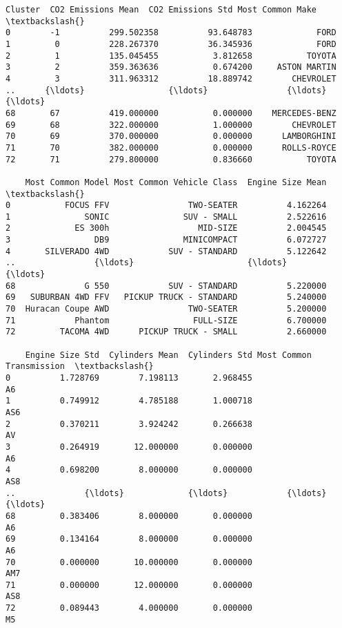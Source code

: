 \documentclass[11pt]{article}
\makeatletter
\newcommand{\boxspacing}{\kern\kvtcb@left@rule\kern\kvtcb@boxsep}
\newcommand{\prompt}[4]{
        {\ttfamily\llap{{\color{#2}[#3]:\hspace{3pt}#4}}\vspace{-\baselineskip}}
    }
\makeatother
\begin{document}
            \begin{tcolorbox}[breakable, size=fbox, boxrule=.5pt, pad at break*=1mm, opacityfill=0]
\prompt{Out}{outcolor}{68}{\boxspacing}
\begin{Verbatim}[commandchars=\\\{\}]
    Cluster  CO2 Emissions Mean  CO2 Emissions Std Most Common Make  \textbackslash{}
0        -1          299.502358          93.648783             FORD
1         0          228.267370          36.345936             FORD
2         1          135.045455           3.812658           TOYOTA
3         2          359.363636           0.674200     ASTON MARTIN
4         3          311.963312          18.889742        CHEVROLET
..      {\ldots}                 {\ldots}                {\ldots}              {\ldots}
68       67          419.000000           0.000000    MERCEDES-BENZ
69       68          322.000000           1.000000        CHEVROLET
70       69          370.000000           0.000000      LAMBORGHINI
71       70          382.000000           0.000000      ROLLS-ROYCE
72       71          279.800000           0.836660           TOYOTA

    Most Common Model Most Common Vehicle Class  Engine Size Mean  \textbackslash{}
0           FOCUS FFV                TWO-SEATER          4.162264
1               SONIC               SUV - SMALL          2.522616
2             ES 300h                  MID-SIZE          2.004545
3                 DB9               MINICOMPACT          6.072727
4       SILVERADO 4WD            SUV - STANDARD          5.122642
..                {\ldots}                       {\ldots}               {\ldots}
68              G 550            SUV - STANDARD          5.220000
69   SUBURBAN 4WD FFV   PICKUP TRUCK - STANDARD          5.240000
70  Huracan Coupe AWD                TWO-SEATER          5.200000
71            Phantom                 FULL-SIZE          6.700000
72         TACOMA 4WD      PICKUP TRUCK - SMALL          2.660000

    Engine Size Std  Cylinders Mean  Cylinders Std Most Common Transmission  \textbackslash{}
0          1.728769        7.198113       2.968455                       A6
1          0.749912        4.785188       1.000718                      AS6
2          0.370211        3.924242       0.266638                       AV
3          0.264919       12.000000       0.000000                       A6
4          0.698200        8.000000       0.000000                      AS8
..              {\ldots}             {\ldots}            {\ldots}                      {\ldots}
68         0.383406        8.000000       0.000000                       A6
69         0.134164        8.000000       0.000000                       A6
70         0.000000       10.000000       0.000000                      AM7
71         0.000000       12.000000       0.000000                      AS8
72         0.089443        4.000000       0.000000                       M5


\end{Verbatim}
\end{tcolorbox}
\end{document}
